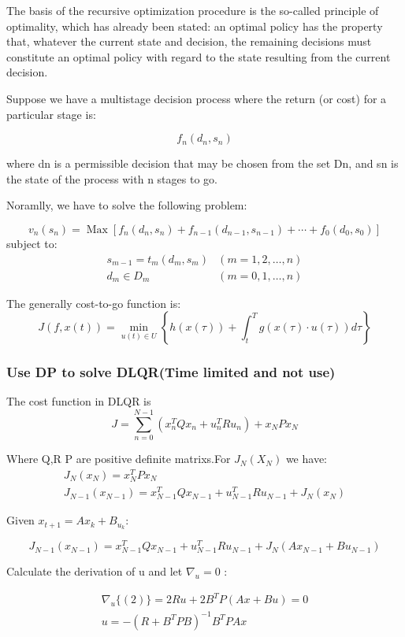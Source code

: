 \documentclass{mcmthesis}
\begin{document}
The basis of the recursive optimization procedure is the so-called principle of optimality, which has already been stated: an optimal policy has the property that, whatever the current state and decision, the remaining decisions must constitute an optimal policy with regard to the state resulting from the current decision.

Suppose we have a multistage decision process where the return (or cost) for a particular stage is:

$$f_n(d_n,s_n)$$

where dn is a permissible decision that may be chosen from the set Dn, and sn is the state of the process with n stages to go.

Noramlly, we have to solve the following problem:

\[
v_{n}\left(s_{n}\right)=\operatorname{Max}\left[f_{n}\left(d_{n}, s_{n}\right)+f_{n-1}\left(d_{n-1}, s_{n-1}\right)+\cdots+f_{0}\left(d_{0}, s_{0}\right)\right]
\]
subject to:
\[
\begin{array}{ll}
s_{m-1}=t_{m}\left(d_{m}, s_{m}\right) & (m=1,2, \ldots, n) \\
d_{m} \in D_{m} & (m=0,1, \ldots, n)
\end{array}
\]

The generally cost-to-go function is:
$$J(f, x(t))=\min _{u(t) \in U}\left\{h(x(\tau))+\int_{t}^{T} g(x(\tau) \cdot u(\tau)) d \tau\right\}$$
\subsubsection{Use DP to solve DLQR(Time limited and not use)}
The cost function in DLQR is
$$J=\sum_{n=0}^{N-1}\left(x_{n}^{T} Q x_{n}+u_{n}^{T} R u_{n}\right)+x_{N} P x_{N}$$

Where  Q,R P are positive definite matrixs.For $J_N(X_N)$ we have:
$$\begin{array}{c}
J_{N}\left(x_{N}\right)=x_{N}^{T} P x_{N} \\
J_{N-1}\left(x_{N-1}\right)=x_{N-1}^{T} Q x_{N-1}+u_{N-1}^{T} R u_{N-1}+J_{N}\left(x_{N}\right)
\end{array}$$ 

Given $x_{t+1}=A x_{k}+B_{u_{k}}$:

$$J_{N-1}\left(x_{N-1}\right)=x_{N-1}^{T} Q x_{N-1}+u_{N-1}^{T} R u_{N-1}+J_{N}\left(A x_{N-1}+B u_{N-1}\right)$$

Calculate the derivation of u and let $\nabla_{u}=0$ :

$$\begin{array}{l}
\nabla_{u}\{(2)\}=2 R u+2 B^{T} P(A x+B u)=0 \\
u=-\left(R+B^{T} P B\right)^{-1} B^{T} P A x
\end{array}$$
\end{document}

